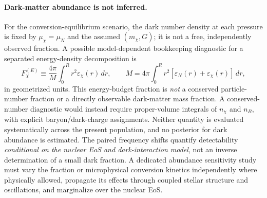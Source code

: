 \documentclass[11pt,a4paper]{article}
\begin{document}
\paragraph{Dark-matter abundance is not inferred.}
For the conversion-equilibrium scenario, the dark number density at each pressure is fixed by $\mu_\chi=\mu_N$ and the assumed $(m_\chi,G)$; it is not a free, independently observed fraction. A possible model-dependent bookkeeping diagnostic for a separated energy-density decomposition is
\begin{equation}
F_{\chi}^{(E)}\equiv
\frac{4\pi}{M}\int_0^R r^2\varepsilon_\chi(r)\,dr,\qquad
M=4\pi\int_0^R r^2[\varepsilon_N(r)+\varepsilon_\chi(r)]\,dr ,
\end{equation}
in geometrized units. This energy-budget fraction is \emph{not} a conserved particle-number fraction or a directly observable dark-matter mass fraction. A conserved-number diagnostic would instead require proper-volume integrals of $n_\chi$ and $n_B$, with explicit baryon/dark-charge assignments. Neither quantity is evaluated systematically across the present population, and no posterior for dark abundance is estimated. The paired frequency shifts quantify detectability \emph{conditional on the nuclear EoS and dark-interaction model}, not an inverse determination of a small dark fraction. A dedicated abundance sensitivity study must vary the fraction or microphysical conversion kinetics independently where physically allowed, propagate its effects through coupled stellar structure and oscillations, and marginalize over the nuclear EoS.
\end{document}
